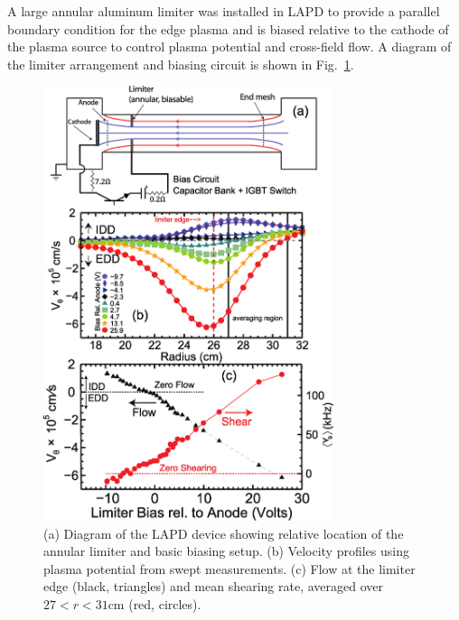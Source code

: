 \documentclass[aip,pop,amsmath,amssymb,reprint,superscriptaddress]{revtex4-1} %
\begin{document}
A large annular aluminum limiter was installed in LAPD to provide a parallel boundary condition for the edge plasma and is biased relative to the cathode of the plasma source to control plasma potential and cross-field flow.  A diagram of the limiter arrangement and biasing circuit is shown in Fig.~\ref{fig:velocity_flowshear}.

\begin{figure}[!htbp]
\centerline{
\includegraphics[width=8.5cm]{figure1.eps}}
\caption{\label{fig:velocity_flowshear} (a) Diagram of the LAPD device showing relative location of the annular limiter and basic biasing setup.  (b) Velocity profiles using plasma potential from swept measurements. (c) Flow at the limiter edge (black, triangles) and mean shearing rate, averaged over $27 < r < 31$cm (red, circles).}
\end{figure}
\end{document}
